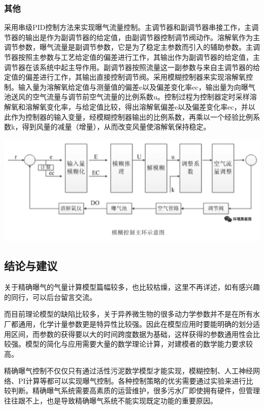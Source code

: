 \documentclass[
]{book}
\begin{document}
\hypertarget{ux5176ux4ed6}{%
\subsubsection{其他}\label{ux5176ux4ed6}}

采用串级PID控制方法来实现曝气流量控制。主调节器和副调节器串接工作，主调节器的输出是作为副调节器的给定值，由副调节器控制调节阀动作。溶解氧作为主调节参数，曝气流量是副调节参数，它是为了稳定主参数而引入的辅助参数。主调节器按照主参数与工艺给定值的偏差进行工作，其输出作为副调节器的给定值，主调节器在该系统中起主导作用。副调节器按照流量这一副参数与来自主调节器的给定值的偏差进行工作，其输出直接控制调节阀。采用模糊控制器来实现溶解氧控制。输入量为溶解氧给定值与测量值的偏差e以及偏差变化率ec，输出量为向曝气池送风的空气流量与调节前空气流量的比例系数u。控制过程为控制器定时采样溶解氧和溶解氧变化率，与给定值比较，得出溶解氧偏差e以及偏差变化率ec，并以此作为控制器的输入变量，经模糊控制器输出的比例系数，再乘以一个经验比例系数k，得到风量的减量（增量），从而改变风量使溶解氧保持稳定。

\includegraphics[width=8.33in]{images/bq7}

\hypertarget{ux7ed3ux8bbaux4e0eux5efaux8bae}{%
\subsection{结论与建议}\label{ux7ed3ux8bbaux4e0eux5efaux8bae}}

关于精确曝气的气量计算模型篇幅较多，也比较枯燥，这里不再详述，如有感兴趣的同行，可以后台留言交流。

而目前理论模型的缺陷比较多，关于异养微生物的很多动力学参数并不是在所有水厂都通用，化学计量参数更是特异性比较强。因此在模型应用时要能明确的划分适用区间，而参数的获得要以大的时间跨度数据为基础，这样获得的参数通用性会比较强。模型的简化与应用需要大量的数学理论计算，对建模者的数学能力要求较高。

精确曝气控制不仅仅只有通过活性污泥数学模型才能实现，模糊控制、人工神经网络、PI计算等都可以实现曝气控制。各种控制策略的优劣需要通过实验来进行比较判断。精确曝气系统需要高素质的运营维护，很多污水厂即使拥有硬件，但管理往往跟不上，也是导致精确曝气系统不能实现既定功能的重要原因。
\end{document}
